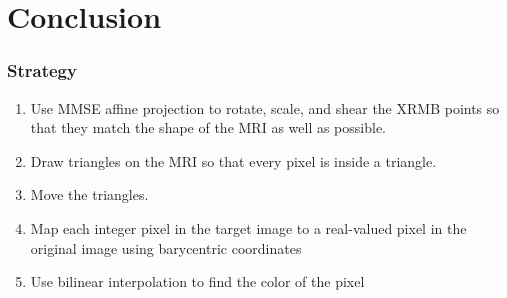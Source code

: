 \documentclass{beamer}
\begin{document}
\section{Conclusion}
\setcounter{subsection}{1}

\begin{frame}
  \frametitle{Strategy}
  \begin{enumerate}
  \item Use MMSE affine projection to rotate, scale, and shear the XRMB
    points so that they match the shape of the MRI as well as possible.
  \item Draw triangles on the MRI so that every pixel is inside a triangle.
  \item Move the triangles.
  \item Map each integer pixel in the target image to a real-valued pixel in the original image
    using barycentric coordinates
  \item Use bilinear interpolation to find the color of the pixel 
  \end{enumerate}
\end{frame}
\end{document}
